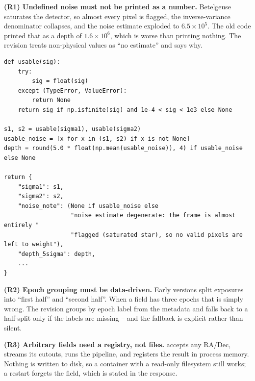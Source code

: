 \documentclass[11pt,a4paper]{article}
\newcommand{\code}[1]{\texttt{\small\detokenize{#1}}}
\begin{document}
\textbf{(R1) Undefined noise must not be printed as a number.} Betelgeuse saturates the detector, so
almost every pixel is flagged, the inverse-variance denominator collapses, and the noise estimate
exploded to $6.5\times10^{5}$. The old code printed that as a depth of $1.6\times10^{6}$, which is
worse than printing nothing. The revision treats non-physical values as ``no estimate'' and says why.

\begin{lstlisting}[style=py,caption={{\small R1: the \texttt{usable()} guard in \texttt{app.py}. Anything
outside $10^{-4}<\sigma<10^{3}$ is not a measurement.}}]
def usable(sig):
    try:
        sig = float(sig)
    except (TypeError, ValueError):
        return None
    return sig if np.isfinite(sig) and 1e-4 < sig < 1e3 else None

s1, s2 = usable(sigma1), usable(sigma2)
usable_noise = [x for x in (s1, s2) if x is not None]
depth = round(5.0 * float(np.mean(usable_noise)), 4) if usable_noise else None

return {
    "sigma1": s1,
    "sigma2": s2,
    "noise_note": (None if usable_noise else
                   "noise estimate degenerate: the frame is almost entirely "
                   "flagged (saturated star), so no valid pixels are left to weight"),
    "depth_5sigma": depth,
    ...
}
\end{lstlisting}

\textbf{(R2) Epoch grouping must be data-driven.} Early versions split exposures into ``first half''
and ``second half''. When a field has three epochs that is simply wrong. The revision groups by epoch
label from the metadata and falls back to a half-split only if the labels are missing -- and the
fallback is explicit rather than silent.

\textbf{(R3) Arbitrary fields need a registry, not files.} \code{/api/field} accepts any RA/Dec,
streams its cutouts, runs the pipeline, and registers the result in process memory. Nothing is written
to disk, so a container with a read-only filesystem still works; a restart forgets the field, which is
stated in the response.
\end{document}
